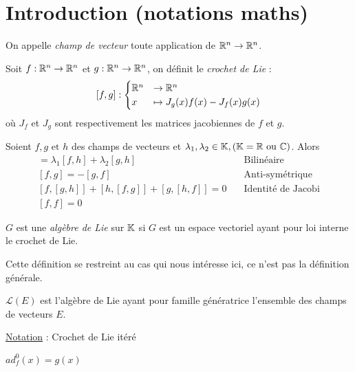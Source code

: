 \documentclass[main.tex]{subfiles}
\newcommand{\Lc}{\mathcal{L}}
\begin{document}
\section{Introduction (notations maths)}

\begin{defin}
  On appelle \emph{champ de vecteur} toute  application de $\mathbb{R}^n \rightarrow \mathbb{R}^n$.
\end{defin}

\begin{defin}
Soit $f : \mathbb{R}^n \rightarrow \mathbb{R}^n$ et $g : \mathbb{R}^n \rightarrow \mathbb{R}^n$, on définit le \emph{crochet de Lie} :
\[ [f,g] :
  \begin{cases}
\mathbb{R}^n & \rightarrow \mathbb{R}^n \\ x & \mapsto J_g(x)f(x) - J_f(x)g(x)
\end{cases}
\]
où $J_f$ et $J_g$ sont respectivement les matrices jacobiennes de $f$ et $g$.
\end{defin}

\begin{prop}
Soient $f, g \text{ et }h$ des champs de vecteurs et $\lambda_1, \lambda_2 \in \mathbb{K}, (\mathbb{K} = \mathbb{R} \text{ ou } \mathbb{C})$.
Alors
\begin{align*}
[\lambda_1 f + \lambda_2 g, h ] =  \lambda_1[f,h] + \lambda_2[g,h] \quad & \text{Bilinéaire} \\
[f,g] = - [g,f] \quad & \text{Anti-symétrique} \\
[f,[g,h]] + [h,[f,g]] + [g,[h,f]] = 0 \quad & \text{Identité de Jacobi} \\
[f,f] = 0 \quad
\end{align*}
\end{prop}
\newpage
\begin{defin}
$G$ est une \emph{algèbre de Lie} sur $\mathbb{K}$ si $G$ est un espace vectoriel ayant pour loi interne le crochet de Lie.
\end{defin}

\begin{rem}
Cette définition se restreint au cas qui nous intéresse ici, ce n'est pas la définition générale.
\end{rem}

\begin{rem}
$\Lc(E)$ est l'algèbre de Lie ayant pour famille génératrice l'ensemble des champs de vecteurs $E$.
\end{rem}

\underline{Notation} : Crochet de Lie itéré

$ad_f^0 (x) = g(x)$
\end{document}
